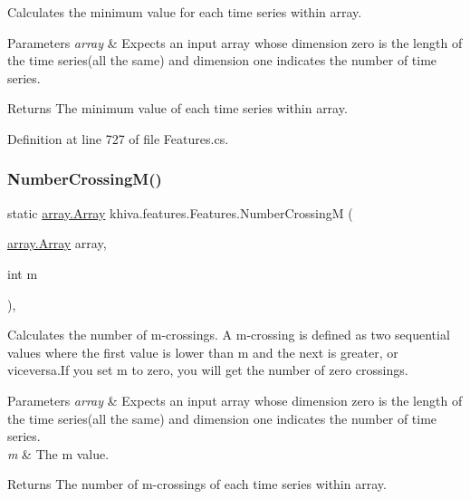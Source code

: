 Calculates the minimum value for each time series within array. 


\begin{DoxyParams}{Parameters}
{\em array} & Expects an input array whose dimension zero is the length of the time series(all the same) and dimension one indicates the number of time series.\\
\hline
\end{DoxyParams}
\begin{DoxyReturn}{Returns}
The minimum value of each time series within array.
\end{DoxyReturn}


Definition at line 727 of file Features.\+cs.

\mbox{\label{classkhiva_1_1features_1_1_features_a9dc2fc89c2b9e1c5a397c6c47ae16171}} 
\subsubsection{\texorpdfstring{Number\+Crossing\+M()}{NumberCrossingM()}}
{\footnotesize\ttfamily static \mbox{\hyperlink{classkhiva_1_1array_1_1_array}{array.\+Array}} khiva.\+features.\+Features.\+Number\+CrossingM (\begin{DoxyParamCaption}\item[{\mbox{\hyperlink{classkhiva_1_1array_1_1_array}{array.\+Array}}}]{array,  }\item[{int}]{m }\end{DoxyParamCaption})\hspace{0.3cm}{\ttfamily [inline]}, {\ttfamily [static]}}



Calculates the number of m-\/crossings. A m-\/crossing is defined as two sequential values where the first value is lower than m and the next is greater, or viceversa.\+If you set m to zero, you will get the number of zero crossings. 


\begin{DoxyParams}{Parameters}
{\em array} & Expects an input array whose dimension zero is the length of the time series(all the same) and dimension one indicates the number of time series.\\
\hline
{\em m} & The m value.\\
\hline
\end{DoxyParams}
\begin{DoxyReturn}{Returns}
The number of m-\/crossings of each time series within array.
\end{DoxyReturn}


